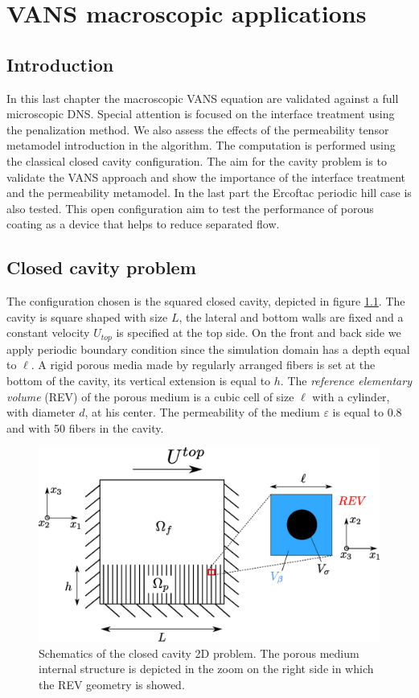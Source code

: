 \chapter{VANS macroscopic applications}


\section{Introduction}

In this last chapter the macroscopic VANS equation are validated against a full microscopic DNS. Special attention is focused on the interface treatment using the penalization method. We also assess the effects of the permeability tensor metamodel introduction in the algorithm. The computation is performed using the classical  closed cavity configuration. The aim for the cavity problem is to validate the VANS approach and show the importance of the interface treatment and the permeability metamodel. In the last part the Ercoftac periodic hill case is also tested. This open configuration aim to test the performance of porous coating as a device that helps to reduce separated flow.


\section{Closed cavity problem}
The configuration chosen is the squared closed cavity, depicted in figure \ref{fig:geom}.
The cavity is square shaped with size $L$, the lateral and bottom walls are fixed and a constant velocity $U_{top}$ is specified at the top side.
On the front and back side we apply periodic boundary condition since the simulation domain has a depth equal to $\ell$.
A rigid porous media made by regularly arranged fibers is set at the bottom of the cavity, its vertical extension is equal to $h$.
The \textit{reference elementary volume} (REV) of the porous medium is a cubic cell of size $\ell$ with a cylinder, with diameter $d$, at his center.
The permeability of the medium $\varepsilon$ is equal to 0.8 and with 50 fibers in the cavity.

\begin{figure}[h]
\centering
\includegraphics[width=0.7\linewidth]{chapter_5/figure/cavity_draw.eps}
\caption{Schematics of the closed cavity 2D problem. The porous medium internal structure is depicted in the zoom on the right side in which the REV geometry is showed.}
\label{fig:geom}
\end{figure}

